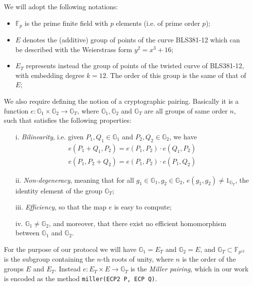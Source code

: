 \documentclass[conference]{IEEEtran}
\begin{document}
We will adopt the following notations:
\begin{itemize}
    \item $\mathbb{F}_p$ is the prime finite field with $p$ elements (i.e. of prime order $p$); %
    \item $E$ denotes the (additive) group of points of the curve BLS381-12 \cite{bls381-12} which can be described with the Weierstrass form  $y^2=x^3 + 16$;
    \item $E_T$ represents instead the group of points of the twisted curve of BLS381-12, with embedding degree $k=12$. The order of this group is the same of that of $E$;
\end{itemize}
We also require defining the notion of a cryptographic pairing. Basically it is a function $e: \mathbb{G}_1\times\mathbb{G}_2\to \mathbb{G}_T$, where $\mathbb{G}_1,\mathbb{G}_2$ and $\mathbb{G}_T$ are all groups of same order $n$, such that satisfies the following properties:
\begin{itemize}
    \item [i.] \emph{Bilinearity}, i.e. given $P_1,Q_1\in\mathbb{G}_1$ and $P_2,Q_2\in\mathbb{G}_2$, we have
    \begin{align*}
        e(P_1+Q_1,P_2) = e(P_1,P_2)\cdot e(Q_1,P_2) \\
        e(P_1,P_2+Q_2) = e(P_1,P_2)\cdot e(P_1,Q_2)
    \end{align*}
    \item[ii.] \emph{Non-degeneracy}, meaning that for all $g_1\in\mathbb{G}_1, g_2\in\mathbb{G}_2$, $e(g_1,g_2)\ne 1_{\mathbb{G}_T}$, the identity element of the group $\mathbb{G}_T$;
    \item[iii.] \emph{ Efficiency}, so that the map $e$ is easy to compute;
    \item[iv. ] $\mathbb{G}_1\ne \mathbb{G}_2$, and moreover, that there exist no efficient homomorphism between $\mathbb{G}_1$ and $\mathbb{G}_2$.
\end{itemize}
For the purpose of our protocol we will have $\mathbb{G}_1 = E_T$ and $\mathbb{G}_2 = E$, and $\mathbb{G}_T\subset \mathbb{F}_{p^{12}}$ is the subgroup containing the $n$-th roots of unity, where $n$ is the order of the groups $E$ and $E_T$. Instead $e: E_T  \times E\to \mathbb{G}_T$ is the \emph{Miller pairing}, which in our work is encoded as the method \verb!miller(ECP2 P, ECP Q)!. \\
\end{document}
